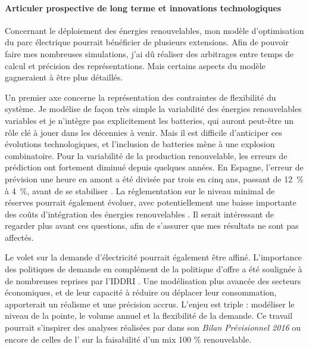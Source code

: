 \paragraph{Articuler prospective de long terme et innovations technologiques} \hfill

Concernant le déploiement des énergies renouvelables, mon modèle d'optimisation du parc électrique pourrait bénéficier de plusieurs extensions. Afin de pouvoir faire mes nombreuses simulations, j’ai dû réaliser des arbitrages entre temps de calcul et précision des représentations. Mais certains aspects du modèle gagneraient à être plus détaillés.

Un premier axe concerne la représentation des contraintes de flexibilité du système. Je modélise de façon très simple la variabilité des énergies renouvelables variables et je n'intègre pas explicitement les batteries, qui auront peut-être un rôle clé à jouer dans les décennies à venir. Mais il est difficile d'anticiper ces évolutions technologiques, et l'inclusion de batteries mène à une explosion combinatoire. 
Pour la variabilité de la production renouvelable, les erreurs de prédiction ont fortement diminué depuis quelques années. En Espagne, l’erreur de prévision une heure en amont a été divisée par trois en cinq ans, passant de 12~\% à 4~\%, avant de se stabiliser \citep{IRENA2017}. La réglementation sur le niveau minimal de réserves pourrait également évoluer, avec potentiellement une baisse importante des coûts d'intégration des énergies renouvelables \citep{Lorenz2017}. Il serait intéressant de regarder plus avant ces questions, afin de s’assurer que mes résultats ne sont pas affectés. 

Le volet sur la demande d’électricité pourrait également être affiné. L’importance des politiques de demande en complément de la politique d’offre a été soulignée à de nombreuses reprises par l'IDDRI \citep{Berghmans2017, Rudinger2017}. Une modélisation plus avancée des secteurs économiques, et de leur capacité à réduire ou déplacer leur consommation, apporterait un réalisme et une précision accrus. L'enjeu est triple : modéliser le niveau de la pointe, le volume annuel et la flexibilité de la demande. Ce travail pourrait s'inspirer des analyses réalisées par \citet{RTE2016} dans son \textit{Bilan Prévisionnel 2016} ou encore de celles de l'\citet{ADEME2015} sur la faisabilité d'un mix 100 \% renouvelable.

